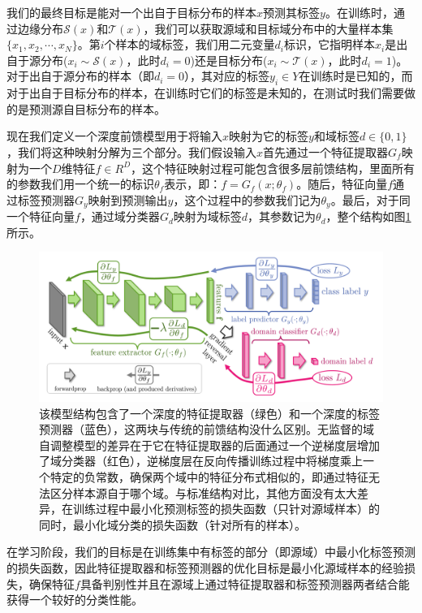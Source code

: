 \documentclass[UTF8]{ctexart}
\begin{document}
我们的最终目标是能对一个出自于目标分布的样本$x$预测其标签$y$。在训练时，通过边缘分布$\mathcal{S}(x)$和$\mathcal{T}(x)$，我们可以获取源域和目标域分布中的大量样本集$\{x_1, x_2, \cdots, x_N\}$。第$i$个样本的域标签，我们用二元变量$d_i$标识，它指明样本$x_i$是出自于源分布($x_i \sim \mathcal{S}(x)$，此时$d_i=0$)还是目标分布($x_i \sim \mathcal{T}(x)$，此时$d_i=1$)。对于出自于源分布的样本（即$d_i=0$），其对应的标签$y_i \in Y$在训练时是已知的，而对于出自于目标分布的样本，在训练时它们的标签是未知的，在测试时我们需要做的是预测源自目标分布的样本。

现在我们定义一个深度前馈模型用于将输入$x$映射为它的标签$y$和域标签$d \in \{0, 1\}$，我们将这种映射分解为三个部分。我们假设输入$x$首先通过一个特征提取器$G_f$映射为一个$D$维特征$f \in R^D$，这个特征映射过程可能包含很多层前馈结构，里面所有的参数我们用一个统一的标识$\theta_f$表示，即：$f = G_f(x;\theta_f)$。随后，特征向量$f$通过标签预测器$G_y$映射到预测输出$y$，这个过程中的参数我们记为$\theta_y$。最后，对于同一个特征向量$f$，通过域分类器$G_d$映射为域标签$d$，其参数记为$\theta_d$，整个结构如图\ref{img: model architecture}所示。
\begin{figure}[htbp]
\begin{center}
\includegraphics[width=0.9\linewidth]{image/model_architecture.png}
\end{center}
\caption{该模型结构包含了一个深度的特征提取器（绿色）和一个深度的标签预测器（蓝色），这两块与传统的前馈结构没什么区别。无监督的域自调整模型的差异在于它在特征提取器的后面通过一个逆梯度层增加了域分类器（红色），逆梯度层在反向传播训练过程中将梯度乘上一个特定的负常数，确保两个域中的特征分布式相似的，即通过特征无法区分样本源自于哪个域。与标准结构对比，其他方面没有太大差异，在训练过程中最小化预测标签的损失函数（只针对源域样本）的同时，最小化域分类的损失函数（针对所有的样本）。}
\label{img: model architecture}
\end{figure}

在学习阶段，我们的目标是在训练集中有标签的部分（即源域）中最小化标签预测的损失函数，因此特征提取器和标签预测器的优化目标是最小化源域样本的经验损失，确保特征$f$具备判别性并且在源域上通过特征提取器和标签预测器两者结合能获得一个较好的分类性能。
\end{document}
